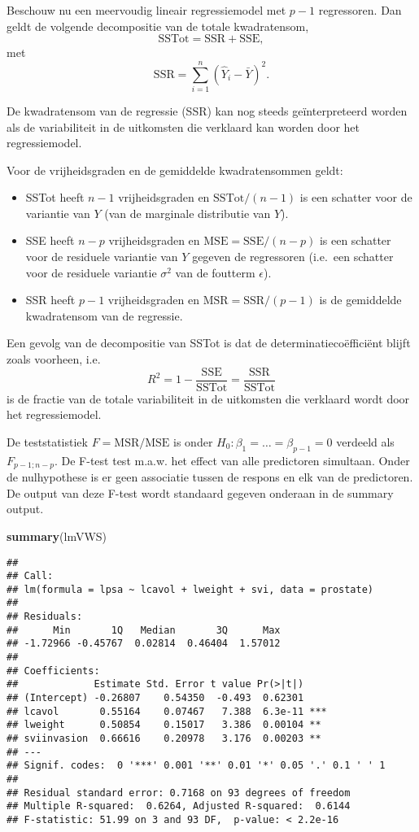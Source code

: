 \documentclass[12pt,dutch,coursenotes]{book}
\newenvironment{Shaded}{\begin{snugshade}}{\end{snugshade}}
\newcommand{\KeywordTok}[1]{\textcolor[rgb]{0.13,0.29,0.53}{\textbf{#1}}}
\newcommand{\NormalTok}[1]{#1}
\providecommand{\tightlist}{%
  \setlength{\itemsep}{0pt}\setlength{\parskip}{0pt}}
\theoremstyle{definition}
\theoremstyle{definition}
\theoremstyle{definition}
\theoremstyle{remark}
\begin{document}
Beschouw nu een meervoudig lineair regressiemodel met \(p-1\)
regressoren. Dan geldt de volgende decompositie van de totale
kwadratensom, \[
  \text{SSTot} = \text{SSR} + \text{SSE} ,
\] met \[
  \text{SSR} = \sum_{i=1}^n (\hat{Y}_i-\bar{Y})^2.
\]

De kwadratensom van de regressie (SSR) kan nog steeds geïnterpreteerd
worden als de variabiliteit in de uitkomsten die verklaard kan worden
door het regressiemodel.

Voor de vrijheidsgraden en de gemiddelde kwadratensommen geldt:

\begin{itemize}
\tightlist
\item
  SSTot heeft \(n-1\) vrijheidsgraden en \(\text{SSTot}/(n-1)\) is een
  schatter voor de variantie van \(Y\) (van de marginale distributie van
  \(Y\)).
\item
  SSE heeft \(n-p\) vrijheidsgraden en \(\text{MSE}=\text{SSE}/(n-p)\)
  is een schatter voor de residuele variantie van \(Y\) gegeven de
  regressoren (i.e.~een schatter voor de residuele variantie
  \(\sigma^2\) van de foutterm \(\epsilon\)).
\item
  SSR heeft \(p-1\) vrijheidsgraden en \(\text{MSR}=\text{SSR}/(p-1)\)
  is de gemiddelde kwadratensom van de regressie.
\end{itemize}

Een gevolg van de decompositie van SSTot is dat de
determinatiecoëfficiënt blijft zoals voorheen, i.e. \[
  R^2 = 1-\frac{\text{SSE}}{\text{SSTot}} = \frac{\text{SSR}}{\text{SSTot}}
\] is de fractie van de totale variabiliteit in de uitkomsten die
verklaard wordt door het regressiemodel.

De teststatistiek \(F=\text{MSR}/\text{MSE}\) is onder
\(H_0:\beta_1=\ldots=\beta_{p-1}=0\) verdeeld als \(F_{p-1;n-p}\). De
F-test test m.a.w. het effect van alle predictoren simultaan. Onder de
nulhypothese is er geen associatie tussen de respons en elk van de
predictoren. De output van deze F-test wordt standaard gegeven onderaan
in de summary output.

\begin{Shaded}
\begin{Highlighting}[]
\KeywordTok{summary}\NormalTok{(lmVWS)}
\end{Highlighting}
\end{Shaded}

\begin{verbatim}
## 
## Call:
## lm(formula = lpsa ~ lcavol + lweight + svi, data = prostate)
## 
## Residuals:
##      Min       1Q   Median       3Q      Max 
## -1.72966 -0.45767  0.02814  0.46404  1.57012 
## 
## Coefficients:
##             Estimate Std. Error t value Pr(>|t|)    
## (Intercept) -0.26807    0.54350  -0.493  0.62301    
## lcavol       0.55164    0.07467   7.388  6.3e-11 ***
## lweight      0.50854    0.15017   3.386  0.00104 ** 
## sviinvasion  0.66616    0.20978   3.176  0.00203 ** 
## ---
## Signif. codes:  0 '***' 0.001 '**' 0.01 '*' 0.05 '.' 0.1 ' ' 1
## 
## Residual standard error: 0.7168 on 93 degrees of freedom
## Multiple R-squared:  0.6264, Adjusted R-squared:  0.6144 
## F-statistic: 51.99 on 3 and 93 DF,  p-value: < 2.2e-16
\end{verbatim}
\end{document}
